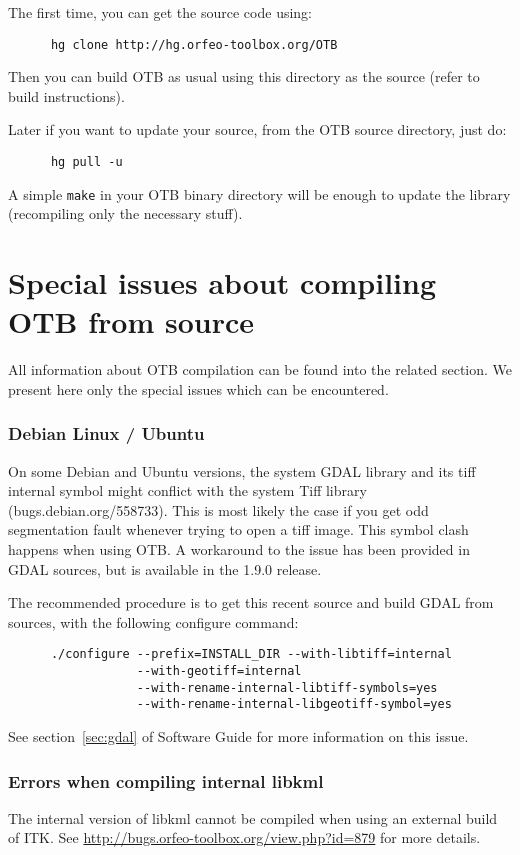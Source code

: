 The first time, you can get the source code using:
\begin{verbatim}
      hg clone http://hg.orfeo-toolbox.org/OTB
\end{verbatim}

Then you can build OTB as usual using this directory as the source (refer to build instructions).

Later if you want to update your source, from the OTB source directory, just do:
\begin{verbatim}
      hg pull -u
\end{verbatim}

A simple \texttt{make} in your OTB binary directory will be enough to update the library (recompiling only the necessary stuff).


\section{Special issues about compiling OTB from source}
\label{sec:FAQInstall}

All information about OTB compilation can be found into the related section.
We present here only the special issues which can be encountered.

\subsubsection{Debian Linux / Ubuntu}

On some Debian and Ubuntu versions, the system GDAL library and its tiff internal symbol might conflict with the system Tiff library (bugs.debian.org/558733). This is most likely the case if you get odd segmentation fault whenever trying to open a tiff image. This symbol clash happens when using OTB. A workaround to the issue has been provided in GDAL sources, but is available in the 1.9.0 release.

The recommended procedure is to get this recent source and build GDAL from sources, with the following configure command:
  \begin{verbatim}
      ./configure --prefix=INSTALL_DIR --with-libtiff=internal
                  --with-geotiff=internal
                  --with-rename-internal-libtiff-symbols=yes
                  --with-rename-internal-libgeotiff-symbol=yes
  \end{verbatim}

See section~\ref{sec:gdal} of Software Guide for more information on this issue.

\subsubsection{Errors when compiling internal libkml}
The internal version of libkml cannot be compiled when using an external build of ITK.
See \url{http://bugs.orfeo-toolbox.org/view.php?id=879} for more details.

